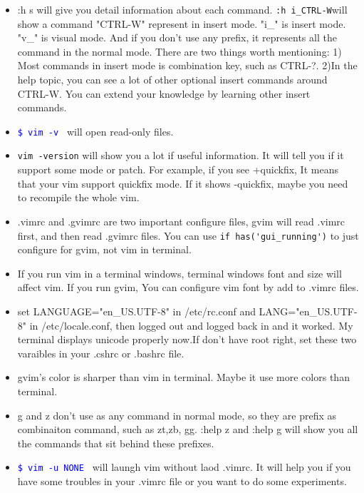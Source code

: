 \documentclass[a4paper,12pt,twoside]{book}
\newcommand{\linuxcommand}[1]{\texttt{\textcolor{blue}{\$ #1 \Pisymbol{psy}{191}}}}
\begin{document}
\begin{itemize}
\item :h s will give you detail information about each command. \verb=:h i_CTRL-W=will show a command "CTRL-W" represent in insert mode. "i\_" is insert mode. "v\_" is visual mode. And if you don't use any prefix, it represents all the command in the normal mode. There are two things worth mentioning: 1) Most commands in insert mode is combination key, such as CTRL-?. 2)In the help topic, you can see a lot of other optional insert commands around CTRL-W. You can extend your knowledge by learning other insert commands.

\item \linuxcommand{vim -v} will open read-only files. 

\item \verb=vim -version= will show you a lot if useful information. It will tell you if it support some mode or patch. For example, if you see +quickfix, It means that your vim support quickfix mode. If it shows -quickfix, maybe you need to recompile the whole vim.

\item .vimrc and .gvimrc are two important configure files, gvim  will read .vimrc first, and then read .gvimrc files.  You can use \verb=if has('gui_running')= to just configure for gvim, not vim in terminal. 

\item If you run vim in a terminal windows, terminal windows font and size will affect vim.  If you run gvim, You can configure vim font by add to .vimrc files.  

\item set LANGUAGE="en\_US.UTF-8" in /etc/rc.conf and LANG="en\_US.UTF-8" in /etc/locale.conf, then logged out and logged back in and it worked. My terminal displays unicode properly now.If don't have root right, set these two varaibles in your .cshrc or .bashrc file.

\item gvim's color is sharper than vim in terminal.  Maybe it use more colors than terminal.  

\item g and z don't use as any command in normal mode, so they are prefix as combinaiton command, such as zt,zb, gg. :help z and :help g will show you all the commands that sit behind these prefixes.
\item \linuxcommand{vim -u NONE} will laungh vim without laod .vimrc. It will help you if you have some troubles in your .vimrc file or you want to do some experiments. 
\end{itemize}
\end{document}
